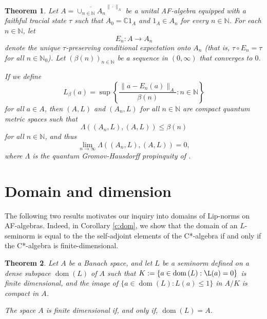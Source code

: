 \documentclass[]{amsart}
\newcommand{\ninnz}{n \in \N_0 }
\newcommand{\N}{{\mathds{N}}}
\newcommand{\C}{{\mathds{C}}}
\newcommand{\dom}[1]{{\operatorname*{dom}\left({#1}\right)}}
\theoremstyle{plain}
\newtheorem{theorem}{Theorem}[section]
\theoremstyle{definition}
\theoremstyle{remark}
\renewcommand{\leq}{\leqslant}
\numberwithin{equation}{section}
\begin{document}
\begin{theorem}{{\cite[Theorem 3.5]{Aguilar-Latremoliere15}}}\label{t:af-lip}
Let $A=\overline{\cup_{n \in \N}A_n}^{\|\cdot\|_A}$ be a unital AF-algebra equipped with a faithful tracial state $\tau$ such that $A_0=\C1_A$ and $1_A\in A_n$ for every $n \in \N$. For each $n \in \N$, let 
\[
E_n:A \rightarrow A_n
\]
denote the unique $\tau$-preserving conditional expectation onto $A_n$ (that is, $\tau \circ E_n=\tau$ for all $\ninnz$). Let $(\beta(n))_{n \in \N}$ be a sequence in $(0,\infty)$ that converges to $0$.   

If we define
\[
L_\beta (a)=\sup \left\{ \frac{\|a-E_n(a)\|_A}{\beta(n)} : n \in \N \right\}
\]
for all $a \in A$, then $(A, L)$ and    $(A_n, L)$ for all $n \in \N$ are     compact quantum metric spaces such that 
\[
\Lambda ((A_n, L), (A, L)) \leq \beta(n)
\]
for all $n \in \N$, and thus
\[
\lim_{n \to \infty} \Lambda ((A_n, L), (A, L))=0,
\]
where $\Lambda$ is the quantum Gromov-Hausdorff propinquity of \cite{Latremoliere13}.
\end{theorem}


 \section{Domain and dimension}\label{s:non-equiv-af}
The following two results motivates our inquiry into domains of Lip-norms on AF-algebras. Indeed, in Corollary \ref{c:dom}, we show that the domain of an $L$-seminorm is equal to the the self-adjoint elements of the C*-algebra if and only if the C*-algebra is finite-dimensional.

\begin{theorem}\label{fd-qcms-thm}
  Let $A$ be a Banach space, and let $L$ be a seminorm defined on a dense subspace $\dom{L}$ of $A$ such that $K:= \{a\in\dom{L}:\L(a)=0\}$ is finite dimensional, and the image of $\{a\in\dom{L}:L(a)\leq 1\}$ in $A/K$ is compact in $A$.

  The space $A$ is finite dimensional if, and only if, $\dom{L} = A$.
\end{theorem}
\end{document}
